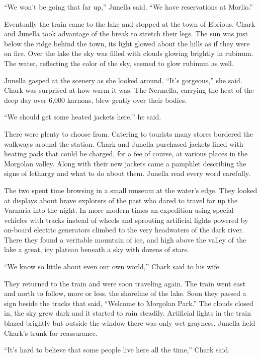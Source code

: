 ``We won't be going that far up,'' Junella said. ``We have reservations at Morlio.''

Eventually the train came to the lake and stopped at the town of Ebrious. Chark and Junella took
advantage of the break to stretch their legs. The sun was just below the ridge behind the town,
its light glowed about the hills as if they were on fire. Over the lake the sky was filled with
clouds glowing brightly in rubinum. The water, reflecting the color of the sky, seemed to glow
rubinum as well.

Junella gasped at the scenery as she looked around. ``It's gorgeous,'' she said. Chark was
surprised at how warm it was. The Nermella, carrying the heat of the deep day over 6,000
karnons, blew gently over their bodies.

``We should get some heated jackets here,'' he said.

There were plenty to choose from. Catering to tourists many stores bordered the walkways around
the station. Chark and Junella purchased jackets lined with heating pads that could be charged,
for a fee of course, at various places in the Morgolan valley. Along with their new jackets came
a pamphlet describing the signs of lethargy and what to do about them. Junella read every word
carefully.

The two spent time browsing in a small museum at the water's edge. They looked at displays about
brave explorers of the past who dared to travel far up the Varnaria into the night. In more
modern times an expedition using special vehicles with tracks instead of wheels and sprouting
artificial lights powered by on-board electric generators climbed to the very headwaters of the
dark river. There they found a veritable mountain of ice, and high above the valley of the lake
a great, icy plateau beneath a sky with dozens of stars.

``We know so little about even our own world,'' Chark said to his wife.

They returned to the train and were soon traveling again. The train went east and north to
follow, more or less, the shoreline of the lake. Soon they passed a sign beside the tracks that
said, ``Welcome to Morgolan Park.'' The clouds closed in, the sky grew dark and it started to
rain steadily. Artificial lights in the train blazed brightly but outside the window there was
only wet grayness. Junella held Chark's trunk for reassurance.

``It's hard to believe that some people live here all the time,'' Chark said.

